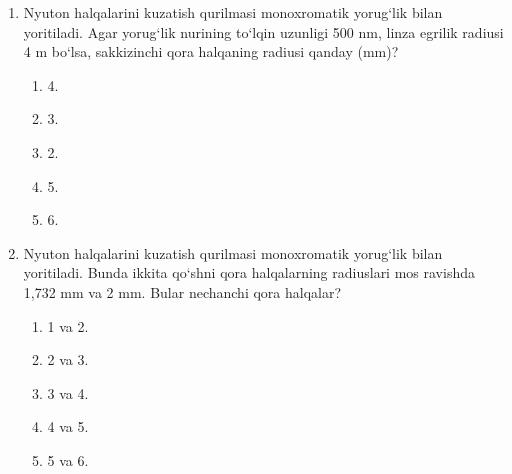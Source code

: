 \begin{enumerate}

\begin{enumerate}[label=\Alph*)]
\item 1,5.
\item 3.
\item 3,2.
\item 4,6.
\item 0,9.
\end{enumerate}

\item Nyuton halqalarini kuzatish qurilmasi monoxromatik yorug‘lik bilan yoritiladi. Agar yorug‘lik nurining to‘lqin uzunligi 500 nm, linza egrilik radiusi 4 m bo‘lsa, sakkizinchi qora halqaning radiusi qanday (mm)?
\begin{enumerate}[label=\Alph*)]
\item 4.
\item 3.
\item 2.
\item 5.
\item 6.
\end{enumerate}

\item Nyuton halqalarini kuzatish qurilmasi monoxromatik yorug‘lik bilan yoritiladi. Bunda ikkita qo‘shni qora halqalarning radiuslari mos ravishda 1,732 mm va 2 mm. Bular nechanchi qora halqalar?
\begin{enumerate}[label=\Alph*)]
\item 1 va 2.
\item 2 va 3.
\item 3 va 4.
\item 4 va 5.
\item 5 va 6.
\end{enumerate}


\end{enumerate}
